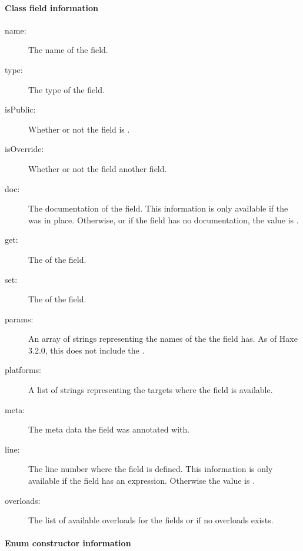 	
\paragraph{Class field information}
\label{cr-rtti-class-field-information}

\begin{description}
	\item[name:] The name of the field.
	\item[type:] The type of the field.
	\item[isPublic:] Whether or not the field is .
	\item[isOverride:] Whether or not the field  another field.
	\item[doc:] The documentation of the field. This information is only available if the   was in place. Otherwise, or if the field has no documentation, the value is .
	\item[get:] The  of the field.
	\item[set:] The  of the field.
	\item[params:] An array of strings representing the names of the  the field has. As of Haxe 3.2.0, this does not include the .
	\item[platforms:] A list of strings representing the targets where the field is available.
	\item[meta:] The meta data the field was annotated with.
	\item[line:] The line number where the field is defined. This information is only available if the field has an expression. Otherwise the value is .
	\item[overloads:] The list of available overloads for the fields or  if no overloads exists.
\end{description}

\paragraph{Enum constructor information}
\label{cr-rtti-enum-constructor-information}

